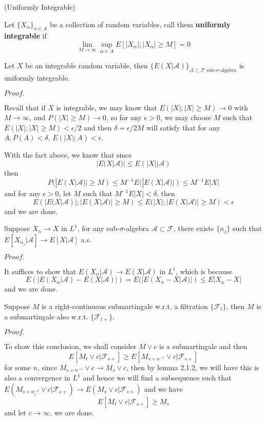 \documentclass{article}
\newcommand{\Pf}[1]{$Proof.$\par}
\newcommand{\F}{\mathcal{F}}
\begin{document}
\begin{definition}(Uniformly Integrable)\par
    Let $\{X_{\alpha}\}_{\alpha \in A}$ be a collection of random variables, call them \textbf{uniformly integrable} if
    \[\lim_{M\to\infty} \sup_{\alpha \in A} E[|X_{\alpha}|;|X_{\alpha}|\geq M] = 0\] 
\end{definition}

\begin{lemma}
    Let $X$ be an integrable random variable, then $\{E(X|\mathcal{A})\}_{\mathcal{A} \subset \F\text{ sub-}\sigma\text{-algebra}}$ is uniformly integrable.
\end{lemma}
\Pf\par
    Recall that if $X$ is integrable, we may know that $E(|X|;|X|\geq M) \to 0$ with $M\to\infty$, and $P(|X|\geq M) \to 0$, so for any $\epsilon >0$, we may choose $M$ such that $E(|X|;|X|\geq M) < \epsilon/2$ and then $\delta = \epsilon/2M$ will satisfy that for any $A, P(A) < \delta$, $E(|X|;A) < \epsilon$.\par
    With the fact above, we know that since
    \[|E(X|\mathcal{A})| \leq E(|X||\mathcal{A})\]
    then
    \[P(|E(X|\mathcal{A})| \geq M) \leq M^{-1}E(|E(X|\mathcal{A})|) \leq M^{-1}E|X|\]
    and for any $\epsilon > 0$, let $M$ such that $M^{-1}E|X| < \delta$, then
    \[E(|E(X|\mathcal{A})|;|E(X|\mathcal{A})| \geq M) \leq E(|X|; |E(X|\mathcal{A})| \geq M) < \epsilon\]
    and we are done.

\begin{lemma}
    Suppose $X_n\to X$ in $L^1$, for any sub-$\sigma$-algebra $\mathcal{A} \subset \F$, there exists $\{n_j\}$ such that $E[X_{n_j}|\mathcal{A}] \to E[X|\mathcal{A}]$ a.s.
\end{lemma}
\Pf\par
    It suffices to show that $E(X_n|\mathcal{A}) \to E(X|\mathcal{A})$ in $L^1$, which is because
    \[E(\left|E(X_n|\mathcal{A})-E(X|\mathcal{A})\right|) = E(|E(X_n-X|\mathcal{A})|) \leq E|X_n-X|\]
    and we are done.

\begin{proposition}
    Suppose $M$ is a right-continuous submartingale w.r.t. a filtration $\{\F_t\}$, then $M$ is a submartingale also w.r.t. $\{\F_{t+}\}$.
\end{proposition}
\Pf\par
    To show this conclusion, we shall consider $M\vee c$ is a submartingale and then \[E[M_t\vee c|\F_{s+}] \geq E[M_{s+n^{-1}}\vee c |\F_{s+}]\]
    for some $n$, since $M_{s+n^{-1}}\vee c \to M_s \vee c$, then by lemma 2.1.2, we will have this is also a convergence in $L^1$ and hence we will find a subsequence such that $E(M_{s+n_j^{-1}}\vee c|\F_{s+}) \to E(M_s\vee c|\F_{s+})$ and we have
    \[E[M_t\vee c|\F_{s+}] \geq M_s\]
    and let $c\to \infty$, we are done.
\end{document}
